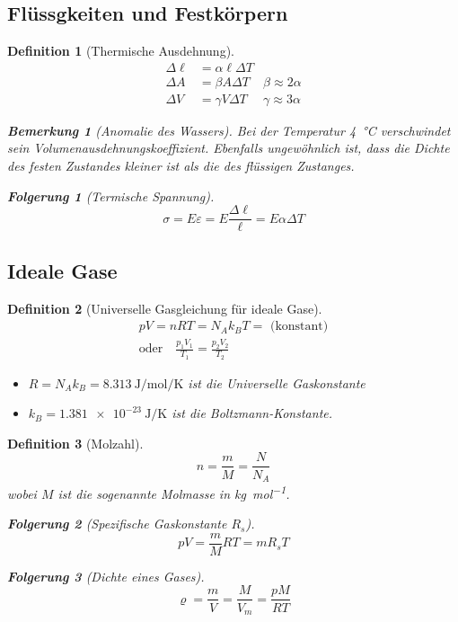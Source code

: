 \documentclass[a4paper, twocolumn]{article}
\numberwithin{equation}{section}
\theoremstyle{hsr-def}
\newtheorem{definition}{Definition}[section]
\theoremstyle{hsr-sub}
\newtheorem{result}{Folgerung}[definition]
\newtheorem{remark}{Bemerkung}[definition]
\begin{document}
\subsection{Fl\"ussgkeiten und Festk\"orpern}
\begin{definition}[Thermische Ausdehnung]
\begin{align*}
    \Delta \ell &= \alpha\ell\Delta T \\
    \Delta A &= \beta A \Delta T & \beta \approx 2\alpha \\
    \Delta V &= \gamma V \Delta T & \gamma \approx 3\alpha
\end{align*}

\begin{remark}[Anomalie des Wassers] Bei der Temperatur \SI{4}{\celsius} verschwindet sein Volumenausdehnungskoeffizient. Ebenfalls ungew\"ohnlich ist, dass die Dichte des festen Zustandes kleiner ist als die des fl\"ussigen Zustanges.
\end{remark}

\begin{result}[Termische Spannung]
\[
    \sigma = E\varepsilon = E\frac{\Delta \ell}{\ell} = E \alpha \Delta T
\]
\end{result}
\end{definition}

\subsection{Ideale Gase}
\begin{definition}[Universelle Gasgleichung f\"ur ideale Gase]
\begin{gather*}
    pV = nRT = N_A k_B T = \text{ (konstant)} \\
    \text{oder} \quad \frac{p_1 V_1}{T_1} = \frac{p_2 V_2}{T_2}
\end{gather*}
\begin{itemize}
    \item \(R = N_A k_B = \SI{8.313}{\joule\per\mole\per\kelvin}\) ist die Universelle Gaskonstante
    \item \(k_B = \SI{1.381e-23}{\joule\per\kelvin}\) ist die Boltzmann-Konstante.
\end{itemize}
\end{definition}

\begin{definition}[Molzahl]
\[
    n = \frac{m}{M} = \frac{N}{N_A}
\]
wobei \(M\) ist die sogenannte Molmasse in \si{\kilo\gram\per\mole}.
\begin{result}[Spezifische Gaskonstante \(R_s\)]
\[
    pV = \frac{m}{M} RT = m R_s T
\]
\end{result}

\begin{result}[Dichte eines Gases]
\[
    \varrho = \frac{m}{V} = \frac{M}{V_m} = \frac{pM}{RT}
\]
\end{result}
\end{definition}
\end{document}
